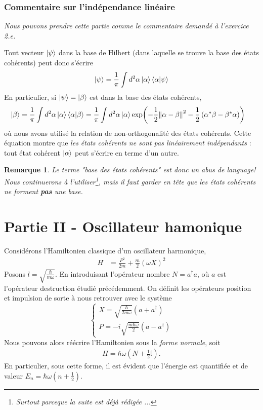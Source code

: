 \documentclass[11pt,oneside,a4paper]{article}
\newcommand{\h}{\ensuremath{\hbar}}
\newtheorem{remark}[theorem]{Remarque}
\begin{document}
\subsubsection{Commentaire sur l'indépendance linéaire}
\emph{Nous pouvons prendre cette partie comme le commentaire demandé à l'exercice 2.e.}

Tout vecteur $\ket{\psi}$ dans la base de Hilbert (dans laquelle se trouve la base des états cohérents) peut donc s'écrire
\begin{align}
  \ket{\psi} = \frac{1}{\pi}\int d^2\alpha \ket{\alpha}\braket{\alpha}{\psi}
\end{align} 
En particulier, si $\ket{\psi} = \ket{\beta}$ est dans la base des états cohérents, 
\begin{align}
  \ket{\beta} &= \frac{1}{\pi} \int d^2\alpha \ket{\alpha}\braket{\alpha}{\beta} = \frac{1}{\pi} \int d^2\alpha \ket{\alpha} \exp(-\frac{1}{2}\norm{\alpha-\beta}^2-\frac{1}{2}\left(\alpha^*\beta-\beta^*\alpha\right))
\end{align}
où nous avons utilisé la relation de non-orthogonalité des états cohérents. Cette équation montre que \emph{les états cohérents ne sont pas linéairement indépendants} : tout état cohérent $\ket{\alpha}$ peut s'écrire en terme d'un autre.

\begin{remark}
  Le terme "base des états cohérents" est donc un abus de language! Nous continuerons à l'utiliser\footnote{Surtout parceque la suite est déjà rédigée ...}, mais il faut garder en tête que les états cohérents ne forment \textbf{pas} une base.
\end{remark}

\section{Partie II - Oscillateur hamonique}
\label{part 2}
Considérons l'Hamiltonien classique d'un oscillateur harmonique, 
\begin{align}
  \label{Hamiltonien OH}
  H &= \frac{P^2}{2m} + \frac{m}{2}\left(\omega X\right)^2
\end{align}
Posons $l = \sqrt{\frac{\h}{m\omega}}$. En introduisant l'opérateur nombre $N = a^\dagger a$, où $a$ est l'opérateur destruction étudié précédemment. On définit les opérateurs position et impulsion de sorte à nous retrouver avec le système
\begin{equation}
  \begin{cases}
    X = \sqrt{\frac{\h}{2m\omega}}\left(a+a^\dagger\right)\\
    P = -i\sqrt{\frac{m\h\omega}{2}}\left(a-a^\dagger\right)
  \end{cases}
  \label{P and X}
\end{equation}
Nous pouvons alors réécrire l'Hamiltonien sous la \emph{forme normale}, soit 
\begin{align}
  \label{Hamiltonien OH normale}
  H = \h\omega\left(N+\frac{1}{2}\mathbb{I}\right).
\end{align}
En particulier, sous cette forme, il est évident que l'énergie est quantifiée et de valeur $E_n = \h\omega\left(n+\frac{1}{2}\right)$.
\end{document}
